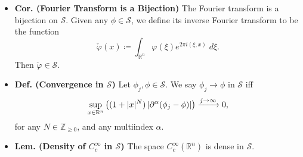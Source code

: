 \documentclass{article}
\begin{document}
\begin{itemize}
{\begin{align}
\begin{split}
 					(-2\pi i \xi)^{\beta}\partial_{\xi}^{\alpha}\hat{\varphi}(\xi) &= \int_{\mathbb{R}^{n}}\varphi(x)(-2\pi i x)^{\alpha}(-2\pi i \zeta)^{\beta}e^{-2\pi i (x, \xi)}\;dx \\
 					&= \int_{\mathbb{R}^{n}}\varphi(x) (-2\pi i x)^{\alpha}\partial_{x}^{\beta}\left(e^{-2\pi i (x, \xi)}\right)\;dx \\
 					&= \int_{\mathbb{R}^{n}}(-1)^{|\beta|}\partial_{x}^{\beta}(\varphi(x)(-2\pi i x)^{\alpha})e^{-2\pi i (x, \xi)}\;dx, 
 				\end{split}
 			\end{align}
 		where the last line follows from integration by parts (which is justified since $\varphi \in \mathcal{S}$). Since $\partial_{x}^{\beta}(\varphi(x)(-2\pi i x)^{\alpha}) \in L^{1}(\mathbb{R}^{n})$ (by property of being a Schwartz function), we must have $\sup_{\zeta \in \mathbb{R}^{n}}\abs{(-2\pi i \xi)^{\beta}\partial_{\xi}^{\alpha}\hat{\varphi}(\xi)} < \infty$, so that the Fourier transform is Schwartz. Hence, the proof concludes. 
 		}
 		
 	\item \textbf{Cor. (Fourier Transform is a Bijection)} The Fourier transform is a bijection on $\mathcal{S}$. Given any $\phi \in \mathcal{S}$, we define 	its inverse Fourier transform to be the function 
 		\begin{equation}
 			\check{\varphi}(x) \coloneqq \int_{\mathbb{R}^{n}}\varphi(\xi)e^{2\pi i (\xi, x)}\;d\xi. 
 		\end{equation}
 	Then $\check{\varphi} \in \mathcal{S}$. 
 	
 	\item \textbf{Def. (Convergence in $\mathcal{S}$)} Let $\phi_{j}, \phi \in \mathcal{S}$. We say $\phi_{j} \to \phi$ in $\mathcal{S}$ iff 
 		\begin{equation}
 			\sup_{x \in \mathbb{R}^{n}}\left((1 + |x|^{N})\left| \partial^{\alpha}(\phi_{j} -\phi) \right|\right) \xrightarrow{j \to \infty} 0, 
 		\end{equation}
 	for any $N \in \mathbb{Z}_{\geq 0}$, and any multiindex $\alpha$. 
 	
 	
 	\item \textbf{Lem. (Density of $C_{c}^{\infty}$ in $\mathcal{S}$)} The space $C_{c}^{\infty}(\mathbb{R}^{n})$ is dense in $\mathcal{S}$. 
 	

\end{itemize}
\end{document}
